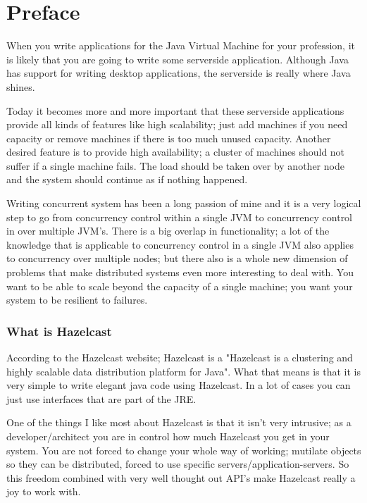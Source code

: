 \chapter*{Preface}

When you write applications for the Java Virtual Machine for your profession, it is likely that you are going to write some serverside application. Although Java has support for writing desktop applications, the serverside is really where Java shines.

Today it becomes more and more important that these serverside applications provide all kinds of features like high scalability; just add machines if you need capacity or remove machines if there is too much unused capacity. Another desired feature is to provide high availability; a cluster of machines should not suffer if a single machine fails. The load should be taken over by another node and
the system should continue as if nothing happened.

Writing concurrent system has been a long passion of mine and it is a very logical step to go from concurrency control within a single JVM to concurrency control in over multiple JVM's. There is a big overlap in functionality; a lot of the knowledge that is applicable to concurrency control in a single JVM also applies to concurrency over multiple nodes; but there also is a whole new dimension of problems that make distributed systems even more interesting to deal with. You want to be able to scale beyond the capacity of a single machine; you want your system to be resilient to failures.

\subsection*{What is Hazelcast}
According to the Hazelcast website; Hazelcast is a "Hazelcast is a clustering and highly scalable data distribution platform for Java". What that means is that it is very simple to write elegant java code using Hazelcast. In a lot of cases you can just use interfaces that are part of the JRE.

One of the things I like most about Hazelcast is that it isn't very intrusive; as a developer/architect you are in control how much Hazelcast you get in your system. You are not forced to change your whole way of working; mutilate objects so they can be distributed, forced to use specific servers/application-servers. So this freedom combined with very well thought out API's make Hazelcast really a joy to work with.

